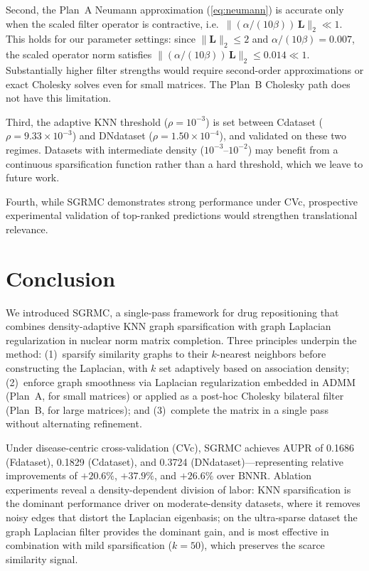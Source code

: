 \documentclass[webpdf,modern,large]{oup-authoring-template}
\begin{document}
Second, the Plan~A Neumann approximation (\eqref{eq:neumann}) is accurate only when the scaled filter operator is contractive, i.e.\ $\|(\alpha/(10\beta))\,\mathbf{L}\|_2 \ll 1$. This holds for our parameter settings: since $\|\mathbf{L}\|_2 \le 2$ and $\alpha/(10\beta) = 0.007$, the scaled operator norm satisfies $\|(\alpha/(10\beta))\,\mathbf{L}\|_2 \le 0.014 \ll 1$. Substantially higher filter strengths would require second-order approximations or exact Cholesky solves even for small matrices. The Plan~B Cholesky path does not have this limitation.

Third, the adaptive KNN threshold ($\rho = 10^{-3}$) is set between Cdataset ($\rho = 9.33 \times 10^{-3}$) and DNdataset ($\rho = 1.50 \times 10^{-4}$), and validated on these two regimes. Datasets with intermediate density ($10^{-3}$--$10^{-2}$) may benefit from a continuous sparsification function rather than a hard threshold, which we leave to future work.

Fourth, while SGRMC demonstrates strong performance under CVc, prospective experimental validation of top-ranked predictions would strengthen translational relevance.

\section{Conclusion}

We introduced SGRMC, a single-pass framework for drug repositioning that combines density-adaptive KNN graph sparsification with graph Laplacian regularization in nuclear norm matrix completion. Three principles underpin the method: (1)~sparsify similarity graphs to their $k$-nearest neighbors before constructing the Laplacian, with $k$ set adaptively based on association density; (2)~enforce graph smoothness via Laplacian regularization embedded in ADMM (Plan~A, for small matrices) or applied as a post-hoc Cholesky bilateral filter (Plan~B, for large matrices); and (3)~complete the matrix in a single pass without alternating refinement.

Under disease-centric cross-validation (CVc), SGRMC achieves AUPR of 0.1686 (Fdataset), 0.1829 (Cdataset), and 0.3724 (DNdataset)---representing relative improvements of $+20.6\%$, $+37.9\%$, and $+26.6\%$ over BNNR. Ablation experiments reveal a density-dependent division of labor: KNN sparsification is the dominant performance driver on moderate-density datasets, where it removes noisy edges that distort the Laplacian eigenbasis; on the ultra-sparse dataset the graph Laplacian filter provides the dominant gain, and is most effective in combination with mild sparsification ($k=50$), which preserves the scarce similarity signal.
\end{document}
